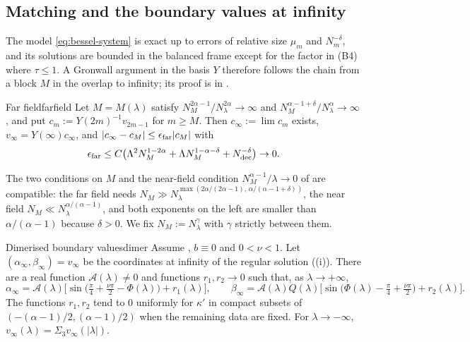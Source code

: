 \subsection{Matching and the boundary values at infinity}

The model \eqref{eq:bessel-system} is exact up to errors of relative size $\mu_m$ and
$N_m^{-\delta}$, and its solutions are bounded in the balanced frame except for the factor in
(B4) where $\tau\le1$. A Gronwall argument in the basis $Y$ therefore follows the chain from a
block $M$ in the overlap to infinity; its proof is in .

\begin{proposition}{Far field}{farfield}
Let $M=M(\lambda)$ satisfy $N_M^{2\alpha-1}/N_\lambda^{2\alpha}\to\infty$ and
$N_M^{\alpha-1+\delta}/N_\lambda^\alpha\to\infty$, and put $c_m:=Y(2m)^{-1}v_{2m-1}$ for $m\ge M$.
Then $c_\infty:=\lim c_m$ exists, $v_\infty=Y(\infty)c_\infty$, and
$|c_\infty-c_M|\le\epsilon_{\rm far}|c_M|$ with
\[
  \epsilon_{\rm far}\le C\bigl(\Lambda^2N_M^{1-2\alpha}+\Lambda N_M^{1-\alpha-\delta}+N_{\rm dec}^{-\delta}\bigr)\to0 .
\]
\end{proposition}

The two conditions on $M$ and the near-field condition $N_M^{\alpha-1}/\lambda\to0$ of
 are compatible: the far field needs
$N_M\gg N_\lambda^{\max(2\alpha/(2\alpha-1),\,\alpha/(\alpha-1+\delta))}$, the near field
$N_M\ll N_\lambda^{\alpha/(\alpha-1)}$, and both exponents on the left are smaller than
$\alpha/(\alpha-1)$ because $\delta>0$. We fix $N_M:=N_\lambda^{\gamma}$ with $\gamma$ strictly
between them.

\begin{theorem}{Dimerised boundary values}{dimer}
Assume , $b\equiv0$ and $0<\nu<1$. Let $(\alpha_\infty,\beta_\infty)=v_\infty$ be the
coordinates at infinity of the regular solution ((i)). There are a real
function $\mathcal A(\lambda)\neq0$ and functions $r_1,r_2\to0$ such that, as
$\lambda\to+\infty$,
\[
  \alpha_\infty=\mathcal A(\lambda)\bigl[\sin\bigl(\tfrac\pi4+\tfrac{\nu\pi}2-\Phi(\lambda)\bigr)+r_1(\lambda)\bigr],\qquad
  \beta_\infty=\mathcal A(\lambda)Q(\lambda)\bigl[\sin\bigl(\Phi(\lambda)-\tfrac\pi4+\tfrac{\nu\pi}2\bigr)+r_2(\lambda)\bigr].
\]
The functions $r_1,r_2$ tend to $0$ uniformly for $\kappa'$ in compact subsets of
$(-(\alpha-1)/2,(\alpha-1)/2)$ when the remaining data are fixed. For $\lambda\to-\infty$,
$v_\infty(\lambda)=\Sigma_3v_\infty(|\lambda|)$.
\end{theorem}


